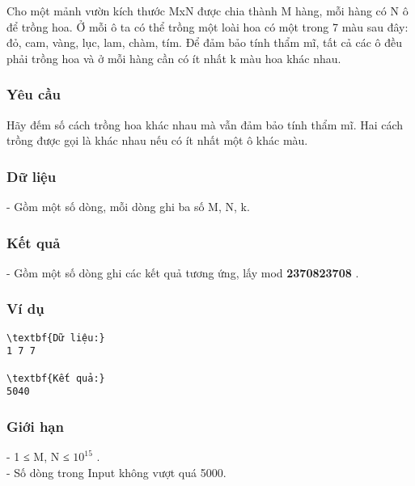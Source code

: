







   Cho một mảnh vườn kích thước MxN được chia thành M hàng, mỗi hàng có N ô để trồng hoa. Ở mỗi ô ta có thể trồng một loài hoa có một trong 7 màu sau đây: đỏ, cam, vàng, lục, lam, chàm, tím. Để đảm bảo tính thẩm mĩ, tất cả các ô đều phải trồng hoa và ở mỗi hàng cần có ít nhất k màu hoa khác nhau.  

\subsubsection{   Yêu cầu  }

   Hãy đếm số cách trồng hoa khác nhau mà vẫn đảm bảo tính thẩm mĩ. Hai cách trồng được gọi là khác nhau nếu có ít nhất một ô khác màu.  

\subsubsection{   Dữ liệu  }

   - Gồm một số dòng, mỗi dòng ghi ba số M, N, k.  

\subsubsection{   Kết quả  }

   - Gồm một số dòng ghi các kết quả tương ứng, lấy mod   \textbf{    2370823708   }   .  

\subsubsection{   Ví dụ  }
\begin{verbatim}
\textbf{Dữ liệu:}
1 7 7

\textbf{Kết quả:}
5040
\end{verbatim}

\subsubsection{   Giới hạn  }

   - 1 ≤ M, N ≤ $10^{15}$   .   
\\   - Số dòng trong Input không vượt quá 5000.  

